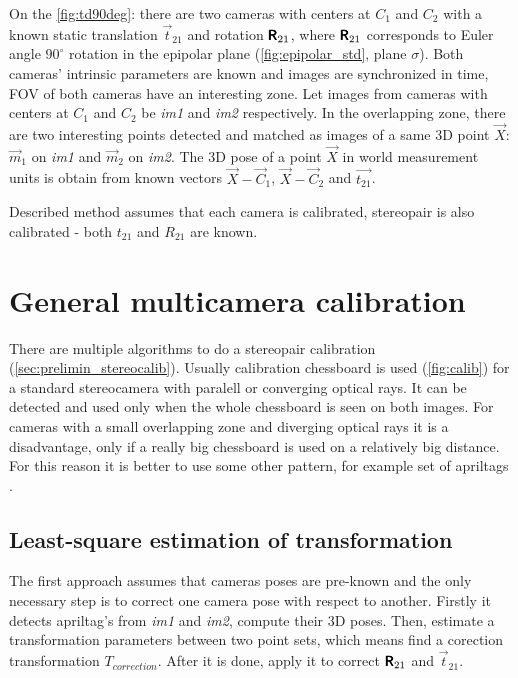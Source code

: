 On the \autoref{fig:td90deg}: there are two cameras with centers at $C_1$ and $C_2$ with a known static translation $\vec{t}_{21}$ and rotation $\pmb{\mathsf{R}}_{21}$, where $\pmb{\mathsf{R}}_{21}$ corresponds to Euler angle $90^\circ$ rotation in the epipolar plane (\autoref{fig:epipolar_std}, plane $\sigma$).
Both cameras' intrinsic parameters are known and images are synchronized in time, FOV of both cameras have an interesting zone.
Let images from cameras with centers at $C_1$ and $C_2$ be \textit{im1} and \textit{im2} respectively.
In the overlapping zone, there are two interesting points detected and matched as images of a same 3D point $\vec{X}$: $\vec{m}_1$ on \textit{im1} and $\vec{m}_2$ on \textit{im2}.
The 3D pose of a point $\vec{X}$ in world measurement units is obtain from known vectors $\vec{X} - \vec{C}_1$, $\vec{X} - \vec{C}_2$ and $\vec{t_{21}}$. 

Described method assumes that each camera is calibrated, stereopair is also calibrated - both $t_{21}$ and $R_{21}$ are known.

\section{General multicamera calibration}
There are multiple algorithms to do a stereopair calibration (\autoref{sec:prelimin_stereocalib}). 
Usually calibration chessboard is used (\autoref{fig:calib}) for a standard stereocamera with paralell or converging optical rays.
It can be detected and used only when the whole chessboard is seen on both images.
For cameras with a small overlapping zone and diverging optical rays it is a disadvantage, only if a really big chessboard is used on a relatively big distance.
For this reason it is better to use some other pattern, for example set of apriltags \cite{Malyuta2019}. 

\subsection{Least-square estimation of transformation}
\label{sec:lsq_umeyama}
The first approach assumes that cameras poses are pre-known and the only necessary step is to correct one camera pose with respect to another.
Firstly it detects apriltag's from \textit{im1} and \textit{im2}, compute their 3D poses.
Then, estimate a transformation parameters between two point sets, which means find a corection transformation $T_{correction}$.
After it is done, 
apply it to correct $\pmb{\mathsf{R}}_{21}$ and $\vec{t}_{21}$.

